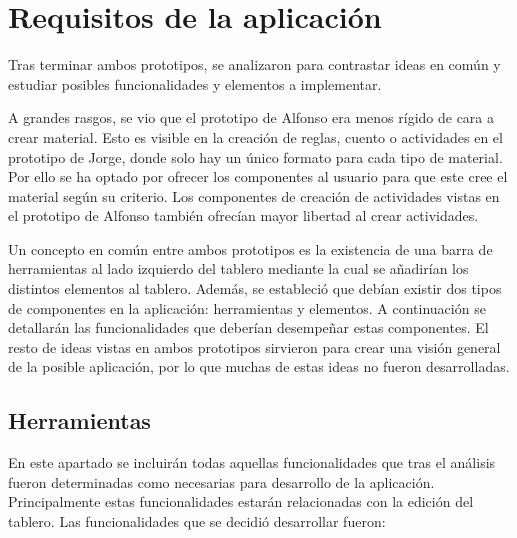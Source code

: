 \section{Requisitos de la aplicación}
\label{cap4:requisitosapp}

Tras terminar ambos prototipos, se analizaron para contrastar ideas en común y estudiar posibles funcionalidades y elementos a implementar.

A grandes rasgos, se vio que el prototipo de Alfonso era menos rígido de cara a crear material. Esto es visible en la creación de reglas, cuento o actividades en el prototipo de Jorge, donde solo hay un único formato para cada tipo de material. Por ello se ha optado por ofrecer los componentes al usuario para que este cree el material según su criterio. Los componentes de creación de actividades vistas en el prototipo de Alfonso también ofrecían mayor libertad al crear actividades. 

Un concepto en común entre ambos prototipos es la existencia de una barra de herramientas al lado izquierdo del tablero mediante la cual se añadirían los distintos elementos al tablero. Además, se estableció que debían existir dos tipos de componentes en la aplicación: herramientas y elementos.
A continuación se detallarán las funcionalidades que deberían desempeñar estas componentes. El resto de ideas vistas en ambos prototipos sirvieron para crear una visión general de la posible aplicación, por lo que muchas de estas ideas no fueron desarrolladas.

\subsection{Herramientas}

En este apartado se incluirán todas aquellas funcionalidades que tras el análisis fueron determinadas como necesarias para desarrollo de la aplicación. Principalmente estas funcionalidades estarán relacionadas con la edición del tablero. Las funcionalidades que se decidió desarrollar fueron:

